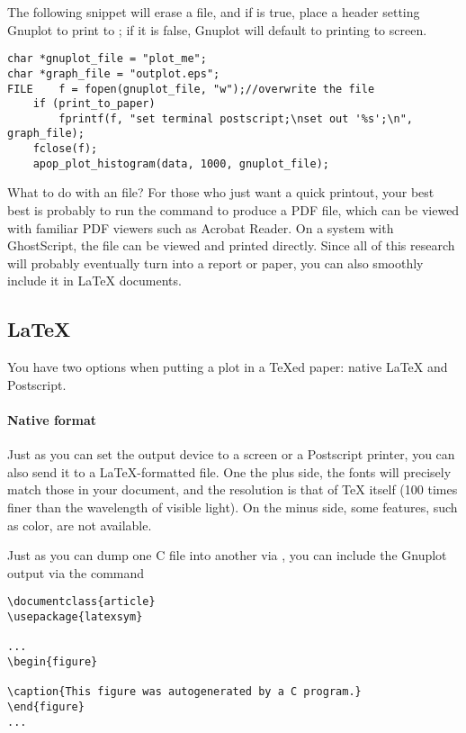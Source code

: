 The following snippet will erase a file, and
if  is true, place a header setting Gnuplot to
print to ; if it is false, Gnuplot will default
to printing to screen.

\begin{lstlisting}
char *gnuplot_file = "plot_me";
char *graph_file = "outplot.eps";
FILE    f = fopen(gnuplot_file, "w");//overwrite the file
    if (print_to_paper)
        fprintf(f, "set terminal postscript;\nset out '%s';\n", graph_file);
    fclose(f);
    apop_plot_histogram(data, 1000, gnuplot_file);
\end{lstlisting}

What to do with an  file? For those who just want a quick
printout, your best best is probably to run the command 
to produce a PDF file, which can be viewed with familiar PDF viewers
such as Acrobat Reader. On a system with GhostScript, the  file
can be viewed and printed directly. Since all of this research will
probably eventually turn into a report or paper, you can also smoothly
include it in \LaTeX{} documents.

\subsection{\treesymbol \LaTeX} 
You have two options when putting a plot in a \TeX{}ed paper: native
\LaTeX{} and Postscript. 

\paragraph{Native format}
Just as you can set the output device to a screen or a Postscript printer,
you can also send it to a \LaTeX-formatted file. One the plus side, the
fonts will precisely match those in your document, and the resolution is
that of \TeX{} itself (100 times finer than the wavelength of
visible light). On the minus side, some features, such as color, are not
available.

Just as you can dump one C file into another via , you can
include the Gnuplot output via the  command
\begin{lstlisting}
\documentclass{article}
\usepackage{latexsym}

...
\begin{figure}

\caption{This figure was autogenerated by a C program.}
\end{figure}
...

\end{lstlisting}

